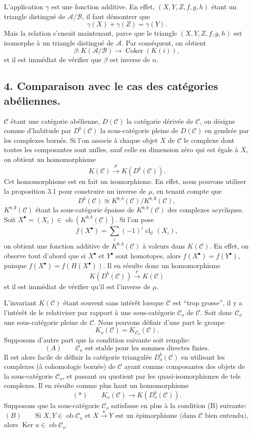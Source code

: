 \documentclass[11pt]{article}
\providecommand{\Ob}{\operatorname{ob}}
\providecommand{\cC}{\mathcal C}
\providecommand{\Ob}{\operatorname{ob}}
\providecommand{\cC}{\mathcal C}
\providecommand{\cA}{\mathcal A}
\providecommand{\cB}{\mathcal B}
\providecommand{\Ob}{\operatorname{Ob}}
\providecommand{\Ob}{\operatorname{ob}}
\providecommand{\Ob}{\operatorname{Ob}}
\begin{document}
L'application $\gamma$ est une fonction additive. En effet, $(X,Y,Z,f,g,h)$ étant un triangle distingué de $\cA/\cB$, il faut démontrer que
\[
\gamma(X)+\gamma(Z)=\gamma(Y).
\]
Mais la relation s'ensuit maintenant, parce que le triangle $(X,Y,Z,f,g,h)$ est isomorphe à un triangle distingué de $\cA$. Par conséquent, on obtient
\[
\beta:K(\cA/\cB)\longrightarrow \operatorname{Coker}(K(i)),
\]
et il est immédiat de vérifier que $\beta$ est inverse de $\alpha$.

\subsection*{4. Comparaison avec le cas des catégories abéliennes.}

$\cC$ étant une catégorie abélienne, $D(\cC)$ la catégorie dérivée de $\cC$, on désigne comme d'habitude par $D^b(\cC)$ la sous-catégorie pleine de $D(\cC)$ 
en%
gendrée par les
complexes bornés. Si l'on associe à chaque objet $X$ de $\cC$ le complexe dont toutes les composantes sont nulles, sauf celle en dimension zéro qui est égale à $X$, on obtient un homomorphisme
\[
K(\cC)\xrightarrow{\mu}K(D^b(\cC)).
\]
Cet homomorphisme est en fait un isomorphisme. En effet, nous pouvons utiliser la proposition 3.1 pour construire un inverse de $\mu$, en tenant compte que
\[
D^b(\cC)\approxeq K^{b,b}(\cC)/K^{b,\emptyset}(\cC),
\]
$K^{b,\emptyset}(\cC)$ étant la sous-catégorie épaisse de $K^{b,b}(\cC)$ des complexes acycliques. Soit $X^\bullet=(X_i)\in\Ob(K^{b,b}(\cC))$. Si l'on pose
\[
f(X^\bullet)=\sum_i(-1)^i\operatorname{cl}_{\cC}(X_i),
\]
on obtient une fonction additive de $K^{b,b}(\cC)$ à valeurs dans $K(\cC)$. En effet, on observe tout d'abord que si $X^\bullet$ et $Y^\bullet$ sont homotopes, alors $f(X^\bullet)=f(Y^\bullet)$, puisque $f(X^\bullet)=f(H(X^\bullet))$. Il en résulte donc un homomorphisme
\[
K(D^b(\cC))\xrightarrow{\nu}K(\cC)
\]
et il est immédiat de vérifier qu'il est l'inverse de $\mu$.

L'invariant $K(\cC)$ étant souvent sans intérêt lorsque $\cC$ est ``trop grosse'', il y a l'intérêt de le relativiser par rapport à une sous-catégorie $\cC_o$ de $\cC$. Soit donc $\cC_o$ une sous-catégorie pleine de $\cC$. Nous pouvons définir d'une part le groupe
\[
K_o(\cC)=K_{\cC_o}(\cC).
\]
Supposons d'autre part que la condition suivante soit remplie:
\[
(A)\qquad \cC_o\text{ est stable pour les sommes directes finies.}
\]
Il est alors facile de définir la catégorie triangulée $D_o^b(\cC)$ en utilisant les complexes (à cohomologie bornée) de $\cC$ ayant comme composantes des objets de la sous-catégorie $\cC_o$, et passant au
quotient par les quasi-isomorphismes de tels complexes. Il en résulte comme plus haut un homomorphisme
\[
(*)\qquad K_o(\cC)\longrightarrow K(D_o^b(\cC)).
\]
Supposons que la sous-catégorie $\cC_o$ satisfasse en plus à la condition (B) suivante:
\[
(B)\qquad
\text{Si }X,Y\in\Ob\cC_o\text{ et }X\xrightarrow{u}Y
\text{ est un épimorphisme (dans }\cC\text{ bien entendu)},
\]
alors $\operatorname{Ker}u\in\Ob\cC_o$.
\end{document}
